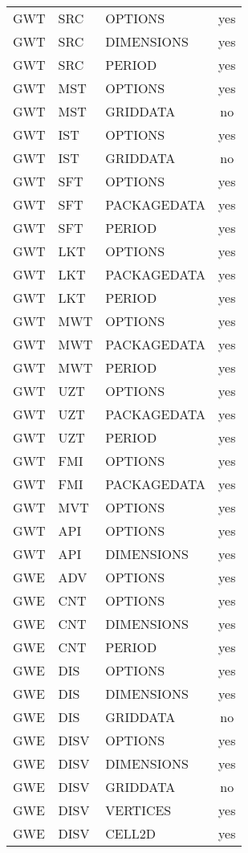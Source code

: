 \begin{longtable}{p{1.5cm} p{1.5cm} p{3cm} c}
\hline
GWT & SRC & OPTIONS & yes \\ 
GWT & SRC & DIMENSIONS & yes \\ 
GWT & SRC & PERIOD & yes \\ 
\hline
GWT & MST & OPTIONS & yes \\ 
GWT & MST & GRIDDATA & no \\ 
\hline
GWT & IST & OPTIONS & yes \\ 
GWT & IST & GRIDDATA & no \\ 
\hline
GWT & SFT & OPTIONS & yes \\ 
GWT & SFT & PACKAGEDATA & yes \\ 
GWT & SFT & PERIOD & yes \\ 
\hline
GWT & LKT & OPTIONS & yes \\ 
GWT & LKT & PACKAGEDATA & yes \\ 
GWT & LKT & PERIOD & yes \\ 
\hline
GWT & MWT & OPTIONS & yes \\ 
GWT & MWT & PACKAGEDATA & yes \\ 
GWT & MWT & PERIOD & yes \\ 
\hline
GWT & UZT & OPTIONS & yes \\ 
GWT & UZT & PACKAGEDATA & yes \\ 
GWT & UZT & PERIOD & yes \\ 
\hline
GWT & FMI & OPTIONS & yes \\ 
GWT & FMI & PACKAGEDATA & yes \\ 
\hline
GWT & MVT & OPTIONS & yes \\ 
\hline
GWT & API & OPTIONS & yes \\ 
GWT & API & DIMENSIONS & yes \\ 
\hline
GWE & ADV & OPTIONS & yes \\ 
\hline
GWE & CNT & OPTIONS & yes \\ 
GWE & CNT & DIMENSIONS & yes \\ 
GWE & CNT & PERIOD & yes \\ 
\hline
GWE & DIS & OPTIONS & yes \\ 
GWE & DIS & DIMENSIONS & yes \\ 
GWE & DIS & GRIDDATA & no \\ 
\hline
GWE & DISV & OPTIONS & yes \\ 
GWE & DISV & DIMENSIONS & yes \\ 
GWE & DISV & GRIDDATA & no \\ 
GWE & DISV & VERTICES & yes \\ 
GWE & DISV & CELL2D & yes \\ 

\end{longtable}
